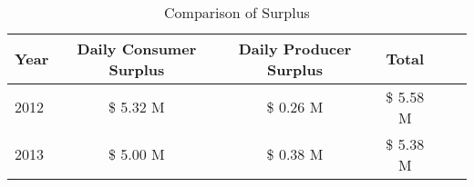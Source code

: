 \begin{table}[h]
\caption{Comparison of Surplus}\label{tab:welfare_price}\\

{
\def\sym#1{\ifmmode^{#1}\else\(^{#1}\)\fi}
\begin{center}
\begin{tabular}{l*{5}{c}}
\hline\hline
Year & Daily Consumer Surplus & Daily Producer Surplus & Total\\
\hline
 2012 & \$ 5.32 M & \$ 0.26 M & \$ 5.58 M\\
 2013 & \$ 5.00 M & \$ 0.38 M & \$ 5.38 M\\

 
 


\hline\hline
\end{tabular}
\end{center}
}


\end{table}
